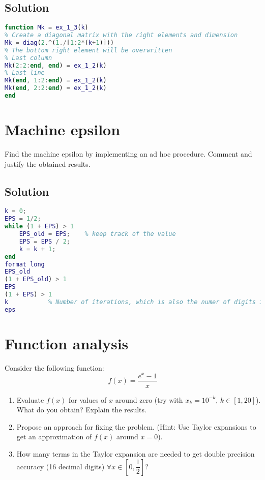 \documentclass[12pt, a4paper]{report}
\begin{document}
    \subsection*{Solution}
        \begin{lstlisting}[language=Matlab]
function Mk = ex_1_3(k)
% Create a diagonal matrix with the right elements and dimension
Mk = diag(2.^(1./[1:2*(k+1)]))
% The bottom right element will be overwritten
% Last column
Mk(2:2:end, end) = ex_1_2(k)
% Last line
Mk(end, 1:2:end) = ex_1_2(k)
Mk(end, 2:2:end) = ex_1_2(k)
end
        \end{lstlisting}

    \newpage

    \section{Machine epsilon}
        Find the machine epsilon by implementing an ad hoc procedure. Comment and justify the obtained results.
    \subsection*{Solution}
        \begin{lstlisting}[language=Matlab]
k = 0;
EPS = 1/2;
while (1 + EPS) > 1
    EPS_old = EPS;    % keep track of the value
    EPS = EPS / 2;
    k = k + 1;
end
format long
EPS_old		
(1 + EPS_old) > 1
EPS
(1 + EPS) > 1
k			% Number of iterations, which is also the numer of digits in the mantissa, according to the standard
eps			 
        \end{lstlisting}

    \newpage

    \section{Function analysis}
        Consider the following function:
        \[f(x)=\dfrac{e^x-1}{x}\]
        \begin{enumerate}
            \item Evaluate $f(x)$ for values of $x$ around zero (try with $x_k = 10^{-k}$, $k \in [1, 20]$). What do you obtain? Explain the results.
            \item Propose an approach for fixing the problem. (Hint: Use Taylor expansions to get an approximation of $f(x)$ around $x = 0$). 
            \item How many terms in the Taylor expansion are needed to get double precision accuracy (16 decimal digits) $\forall x \in \left[0, \dfrac{1}{2}\right]$?
        \end{enumerate}
\end{document}

